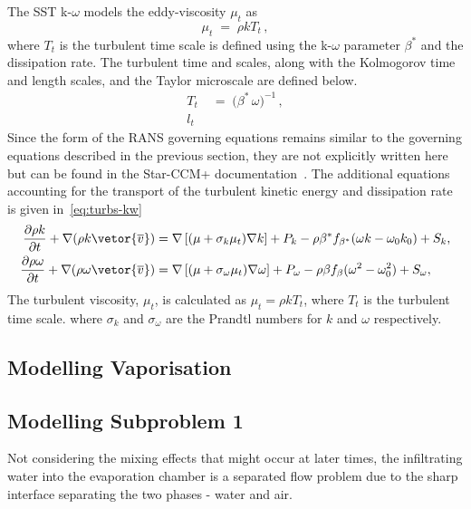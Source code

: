 The SST k-$\omega$ models the eddy-viscosity $\mu_{t}$ as
\begin{equation}
  \mu_{t}\;=\;\rho k T_{t}\,,
\end{equation}
 where $T_{t}$ is the turbulent time scale is defined using the k-$\omega$ parameter $\beta^{*}$ and the dissipation rate.
 The turbulent time and scales, along with the Kolmogorov time and length scales, and the Taylor microscale are defined below.
 \begin{subequations}
  \begin{align}
    T_{t}&\;=\; \bigl(\beta^{*}\,\omega\bigr)^{-1}\,,\\
    l_{t}
  \end{align}
\end{subequations}
Since the form of the RANS governing equations remains similar to the governing equations described in the
 previous section, they are not explicitly written here but can be found in the Star-CCM+ documentation~.
 The additional equations accounting for the transport of the turbulent kinetic energy and dissipation rate 
 is given in~\eqref{eq:turbs-kw}
 \begin{subequations}\label{eq:turbs-kw}
 \begin{align}
    \frac{\partial \rho k}{\partial t}  + \nabla (\rho k \vetor{\overline{v}}) &= \nabla \left[(\mu + \sigma_{k} \mu_{t})\nabla k\right] + P_k
        - \rho \beta^{*}f_{\beta^{*}} (\omega k - \omega_0 k_0) + S_k,\\
    \frac{\partial \rho \omega}{\partial t} + \nabla (\rho \omega \vetor{\overline{v}}) & = \nabla\left[(\mu + \sigma_{\omega}\mu_t) \nabla \omega\right] + P_{\omega}
        - \rho \beta f_{\beta}(\omega^{2} - \omega_{0}^{2}) + S_{\omega},
 \end{align} 
 \end{subequations}
 The turbulent viscosity, $\mu_t$, is calculated as $\mu_{t} = \rho k T_{t}$, where $T_{t}$ is the turbulent time scale. 
 where $\sigma_{k}$ and $\sigma_{\omega}$ are the Prandtl numbers for $k$ and $\omega$ respectively. 

\subsection{Modelling Vaporisation}
\subsection{Modelling Subproblem 1}
Not considering the mixing effects that might occur at later times, the infiltrating
 water into the evaporation chamber is a separated flow problem due to the sharp interface
 separating the two phases - water and air.
 
